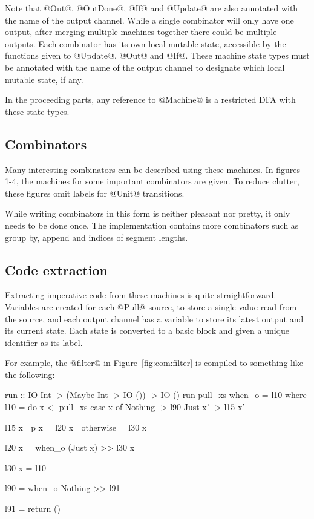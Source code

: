 Note that @Out@, @OutDone@, @If@ and @Update@ are also annotated with the name of the output channel.
While a single combinator will only have one output, after merging multiple machines together there could be multiple outputs.
Each combinator has its own local mutable state, accessible by the functions given to @Update@, @Out@ and @If@.
These machine state types must be annotated with the name of the output channel to designate which local mutable state, if any.

In the proceeding parts, any reference to @Machine@ is a restricted DFA with these state types.

\subsection{Combinators}
Many interesting combinators can be described using these machines.
In figures 1-4, the machines for some important combinators are given.
To reduce clutter, these figures omit labels for @Unit@ transitions.

While writing combinators in this form is neither pleasant nor pretty, it only needs to be done once.
The implementation contains more combinators such as group by, append and indices of segment lengths.






\subsection{Code extraction}

Extracting imperative code from these machines is quite straightforward.
Variables are created for each @Pull@ source, to store a single value read from the source, and each output channel has a variable to store its latest output and its current state.
Each state is converted to a basic block and given a unique identifier as its label.

For example, the @filter@ in Figure~\ref{fig:com:filter} is compiled to something like the following:
\begin{code}
run :: IO Int -> (Maybe Int -> IO ()) -> IO ()
run pull_xs when_o = l10
 where
  l10 = do  x  <- pull_xs
            case x of
             Nothing -> l90
             Just x' -> l15 x'

  l15 x | p x       = l20 x
        | otherwise = l30 x

  l20 x =   when_o (Just x)  >> l30 x

  l30 x =   l10

  l90   =   when_o Nothing  >> l91

  l91   =   return ()
\end{code}


